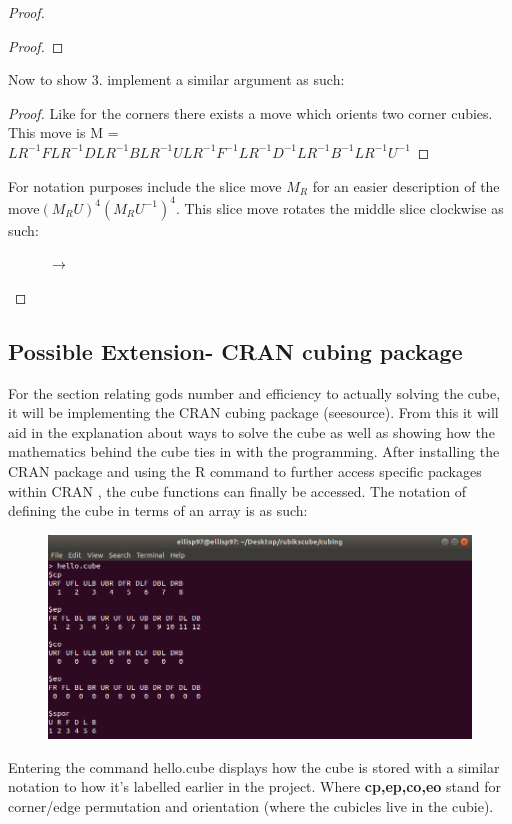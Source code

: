\documentclass{article}
\begin{document}
\begin{proof}
\begin{proof}
\end{proof}Now to show 3. implement a similar argument as such:
\begin{proof}
Like for the corners there exists a move which orients two corner cubies. This move is M = $LR^{-1}FLR^{-1}DLR^{-1}BLR^{-1}ULR^{-1}F^{-1}LR^{-1}D^{-1}LR^{-1}B^{-1}LR^{-1}U^{-1}$
\end{proof} For notation purposes include the slice move $M_{R}$ for an easier description of the move$(M_{R}U)^{4}(M_{R}U^{-1})^{4}$. This slice move rotates the middle slice clockwise as such:

\begin{figure}[h]
\RubikCubeSolved%
%
%
\hspace{.5cm}
\hspace{1cm}$\longrightarrow$
\hspace{1cm}
%
\end{figure}


\end{proof}

\newpage
\subsection*{Possible Extension- CRAN cubing package}

For the section relating gods number and efficiency to actually solving the cube, it will be implementing the CRAN cubing package (seesource). From this it will
aid in the explanation about ways to solve the cube as well as showing how the mathematics behind the cube ties in with the programming.
After installing the CRAN package and using the R command to further access specific packages within CRAN , the cube functions can finally be accessed. The notation of defining the cube in terms of an array is as such:

\begin{figure}[h]
	\centering
	\includegraphics[scale=.75]{terminalcube.png}
\end{figure}
Entering the command hello.cube displays how the cube is stored with a similar notation to how it's labelled earlier in the project. Where \textbf{cp,ep,co,eo} stand for corner/edge permutation and orientation (where the cubicles live in the cubie).
\end{document}
